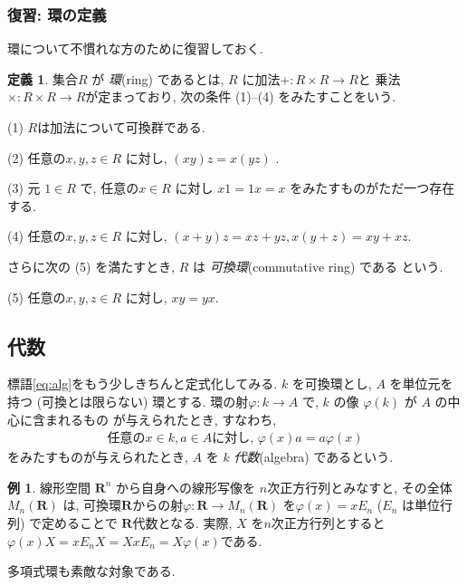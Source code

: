 \documentclass[11pt, a4paper, dvipdfmx]{jsarticle}
\theoremstyle{definition}
\newtheorem{Definition}[Axiom]{定義}
\newtheorem{Example}[Axiom]{例}
\newcommand{\rr}{\mathbf{R}}
\newcommand{\pphi}{\varphi} %
\numberwithin{equation}{section}
\begin{document}
\subsubsection*{復習: 環の定義}

環について不慣れな方のために復習しておく. 

\begin{Definition}\label{def:ring}
    集合$R$ が \emph{環}(ring) であるとは, 
    $R$ に加法$+\colon R\times R\to R$と
    乗法$\times\colon R\times R\to R$が定まっており, 
    次の条件 (1)--(4) をみたすことをいう. 

    (1) 
    $R$は加法について可換群である. 

    (2) 
    任意の$x,y,z\in R$ に対し, 
    $(xy)z = x(yz)$ . 

    (3) 
    元 $1\in R$ で, 
    任意の$x\in R$ に対し $x1 = 1x = x$ 
    をみたすものがただ一つ存在する. 

    (4) 
    任意の$x,y,z\in R$ に対し, 
    $(x+y)z = xz+yz, x(y+z) = xy+xz$. 
\end{Definition}
さらに次の (5) を満たすとき, $R$ は
\emph{可換環}(commutative ring) である
という. 

(5) 
任意の$x,y,z\in R$ に対し, 
$xy = yx$. 

\subsection{代数}

標語\ref{eq:alg}をもう少しきちんと定式化してみる. 
$k$ を可換環とし, 
$A$ を単位元を持つ (可換とは限らない) 環とする. 
環の射$\pphi : k \to A$ で, 
$k$ の像 $\pphi(k)$ が $A$ の中心に含まれるもの
が与えられたとき, すなわち, 
\begin{align*}
    \text{任意の}x\in k, a\in A \text{に対し, }
    \pphi(x) a = a \pphi(x)
\end{align*}
をみたすものが与えられたとき, 
$A$ を $k$ \emph{代数}(algebra) であるという. 

\begin{Example}\label{alg:mat}
    線形空間 $\rr^n$ から自身への線形写像を
    $n$次正方行列とみなすと, その全体 $M_n(\rr)$ は, 
    可換環$\rr$からの射$\pphi : \rr \to M_n(\rr)$
    を$\pphi(x) = xE_n$ ($E_n$ は単位行列) で定めることで
    $\rr$代数となる. 
    実際, $X$ を$n$次正方行列とすると
    $\pphi(x)X = xE_n X = X x E_n = X\pphi(x)$である. 
\end{Example}

多項式環も素敵な対象である. 
\end{document}
